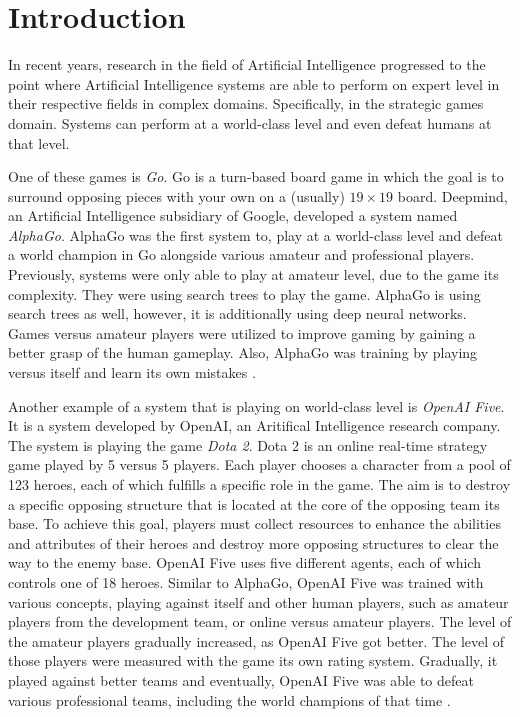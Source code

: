 \chapter{Introduction}
\label{chap:introduction}
In recent years, research in the field of Artificial Intelligence progressed to the point where Artificial Intelligence systems are able to perform on expert level in their respective fields in complex domains. Specifically, in the strategic games domain. Systems can perform at a world-class level and even defeat humans at that level. 

One of these games is \textit{Go}. Go is a turn-based board game in which the goal is to surround opposing pieces with your own on a (usually) $19 \times 19$ board. Deepmind, an Artificial Intelligence subsidiary of Google, developed a system named \textit{AlphaGo}. AlphaGo was the first system to, play at a world-class level and defeat a world champion in Go alongside various amateur and professional players. Previously, systems were only able to play at amateur level, due to the game its complexity. They were using search trees to play the game. AlphaGo is using search trees as well, however, it is additionally using deep neural networks. Games versus amateur players were utilized to improve gaming by gaining a better grasp of the human gameplay. Also, AlphaGo was training by playing versus itself and learn its own mistakes \cite{silver2017mastering}.

Another example of a system that is playing on world-class level is \textit{OpenAI Five}. It is a system developed by OpenAI, an Aritifical Intelligence research company. The system is playing the game \textit{Dota 2}. Dota 2 is an online real-time strategy game played by 5 versus 5 players. Each player chooses a character from a pool of 123 heroes, each of which fulfills a specific role in the game. The aim is to destroy a specific opposing structure that is located at the core of the opposing team its base. To achieve this goal, players must collect resources to enhance the abilities and attributes of their heroes and destroy more opposing structures to clear the way to the enemy base. OpenAI Five uses five different agents, each of which controls one of 18 heroes. Similar to AlphaGo, OpenAI Five was trained with various concepts, playing against itself and other human players, such as amateur players from the development team, or online versus amateur players. The level of the amateur players gradually increased, as OpenAI Five got better. The level of those players were measured with the game its own rating system. Gradually, it played against better teams and eventually, OpenAI Five was able to defeat various professional teams, including the world champions of that time \cite{berner2019dota}.

